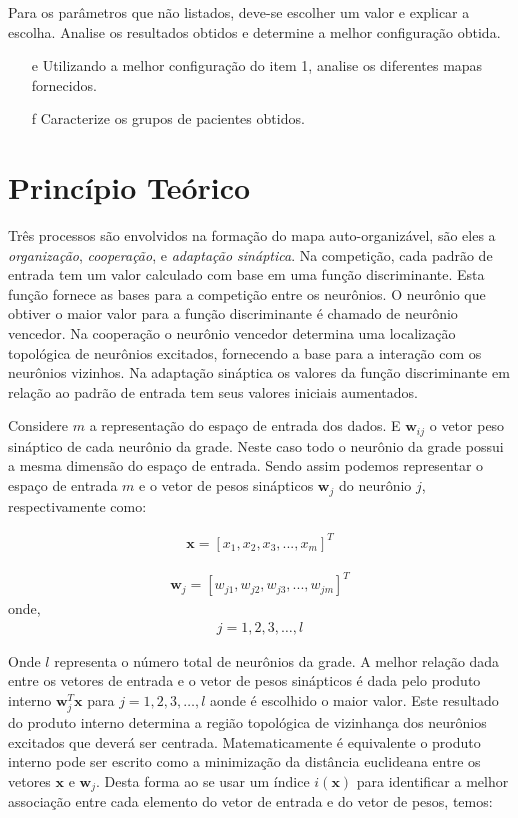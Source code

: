 \documentclass[journal, a4paper]{IEEEtran}
\begin{document}
Para os parâmetros que não listados, deve-se escolher um valor e explicar a escolha. Analise os resultados obtidos e determine a melhor configuração obtida.

\begin{itemize}[Análise dos resultados:]
\item[e] Utilizando a melhor configuração do item 1, analise os diferentes mapas fornecidos.
\item[f] Caracterize os grupos de pacientes obtidos.
\end{itemize}


\section{Princípio Teórico}



Três processos são envolvidos na formação do mapa auto-organizável, são eles a \textit{organização}, \textit{cooperação}, e \textit{adaptação sináptica}. Na competição, cada padrão de entrada tem um valor calculado com base em uma função discriminante. Esta função fornece as bases para a competição entre os neurônios. O neurônio que obtiver o maior valor para a função discriminante é chamado de neurônio vencedor. Na cooperação o neurônio vencedor determina uma localização topológica de neurônios excitados, fornecendo a base para a interação com os neurônios vizinhos. Na adaptação sináptica os valores da função discriminante em relação ao padrão de entrada tem seus valores iniciais aumentados. 

Considere $\textit{m}$ a representação do espaço de entrada dos dados. E $\textbf{w}_{ij}$ o vetor peso sináptico de cada neurônio da grade. Neste caso todo o neurônio da grade possui a mesma dimensão do espaço de entrada. Sendo assim podemos representar o espaço de entrada $\textit{m}$ e o vetor de pesos sinápticos $\textbf{w}_{j}$ do neurônio $j$, respectivamente como:

\begin{eqnarray}
	\textbf{x}=[x_{1}, x_{2}, x_{3}, ..., x_{m}]^{T} 
\end{eqnarray}

\begin{eqnarray}
	\textbf{w}_{j}= [w_{j1}, w_{j2}, w_{j3}, ..., w_{jm}]^{T}
\end{eqnarray}
onde,
\begin{eqnarray}
	j=1,2,3,\hdots,l \nonumber
\end{eqnarray}

Onde $l$ representa o número total de neurônios da grade. A melhor relação dada entre os vetores de entrada e o vetor de pesos sinápticos é dada pelo produto interno $\textbf{w}_{j}^{T}\textbf{x}$ para $j=1,2,3,\hdots,l$ aonde é escolhido o maior valor. Este resultado do produto interno determina a região topológica de vizinhança dos neurônios excitados que deverá ser centrada. Matematicamente é equivalente o produto interno pode ser escrito como a minimização da  distância euclideana entre os vetores $\textbf{x}$ e $\textbf{w}_{j}$. Desta forma ao se usar um índice $i(\textbf{x})$ para identificar a melhor associação entre cada elemento do vetor de entrada e do vetor de pesos, temos:
\end{document}
